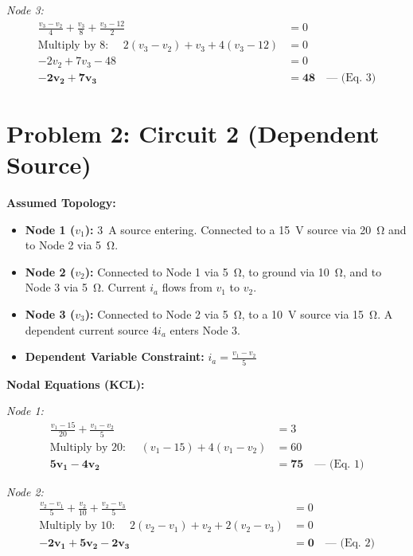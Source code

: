 \documentclass[11pt]{article}
\begin{document}
\textit{Node 3:}
\begin{align*}
  \frac{v_3 - v_2}{4} + \frac{v_3}{8} + \frac{v_3 - 12}{2} &= 0 \\
  \text{Multiply by 8: } \quad 2(v_3 - v_2) + v_3 + 4(v_3 - 12) &= 0 \\
  -2v_2 + 7v_3 - 48 &= 0 \\
  \mathbf{-2v_2 + 7v_3} &\mathbf{= 48} \quad \text{--- (Eq. 3)}
\end{align*}

\section*{Problem 2: Circuit 2 (Dependent Source)}

\textbf{Assumed Topology:}
\begin{itemize}
  \item \textbf{Node 1 ($v_1$):} \SI{3}{\ampere} source entering. Connected to a \SI{15}{\volt} source via \SI{20}{\ohm} and to Node 2 via \SI{5}{\ohm}.
  \item \textbf{Node 2 ($v_2$):} Connected to Node 1 via \SI{5}{\ohm}, to ground via \SI{10}{\ohm}, and to Node 3 via \SI{5}{\ohm}. Current $i_a$ flows from $v_1$ to $v_2$.
  \item \textbf{Node 3 ($v_3$):} Connected to Node 2 via \SI{5}{\ohm}, to a \SI{10}{\volt} source via \SI{15}{\ohm}. A dependent current source $4i_a$ enters Node 3.
  \item \textbf{Dependent Variable Constraint:} $i_a = \frac{v_1 - v_2}{5}$
\end{itemize}

\textbf{Nodal Equations (KCL):}

\textit{Node 1:}
\begin{align*}
  \frac{v_1 - 15}{20} + \frac{v_1 - v_2}{5} &= 3 \\
  \text{Multiply by 20: } \quad (v_1 - 15) + 4(v_1 - v_2) &= 60 \\
  \mathbf{5v_1 - 4v_2} &\mathbf{= 75} \quad \text{--- (Eq. 1)}
\end{align*}

\textit{Node 2:}
\begin{align*}
  \frac{v_2 - v_1}{5} + \frac{v_2}{10} + \frac{v_2 - v_3}{5} &= 0 \\
  \text{Multiply by 10: } \quad 2(v_2 - v_1) + v_2 + 2(v_2 - v_3) &= 0 \\
  \mathbf{-2v_1 + 5v_2 - 2v_3} &\mathbf{= 0} \quad \text{--- (Eq. 2)}
\end{align*}
\end{document}
